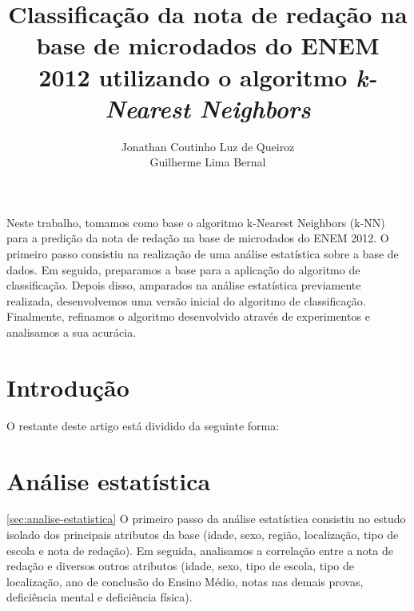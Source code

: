 \documentclass[12pt]{article}
\title{Classificação da nota de redação na base de microdados do ENEM 2012 utilizando o algoritmo \emph{k-Nearest Neighbors}}
\author{Jonathan Coutinho Luz de Queiroz\inst{1} \\ Guilherme Lima Bernal\inst{1}}
\begin{document}
 

\maketitle

\begin{resumo}
Neste trabalho, tomamos como base o algoritmo k-Nearest Neighbors (k-NN) para a predição da nota de redação na base de microdados do ENEM 2012.
O primeiro passo consistiu na realização de uma análise estatística sobre a base de dados.
Em seguida, preparamos a base para a aplicação do algoritmo de classificação.
Depois disso, amparados na análise estatística previamente realizada, desenvolvemos uma versão inicial do algoritmo de classificação.
Finalmente, refinamos o algoritmo desenvolvido através de experimentos e analisamos a sua acurácia.
\end{resumo}


\section{Introdução}

O restante deste artigo está dividido da seguinte forma:

\section{Análise estatística}
\ref{sec:analise-estatistica}
O primeiro passo da análise estatística consistiu no estudo isolado dos principais atributos da base (idade, sexo, região, localização, tipo de escola e nota de redação).
Em seguida, analisamos a correlação entre a nota de redação e diversos outros atributos (idade, sexo, tipo de escola, tipo de localização, ano de conclusão do Ensino Médio, notas nas demais provas, deficiência mental e deficiência física).
\end{document}
